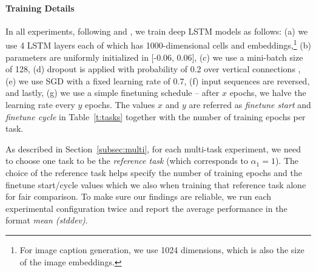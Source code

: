 \paragraph{Training Details}

In all experiments, following \citet{sutskever14} and \citet{luong15}, we train deep LSTM
models as follows: (a) we use 4 LSTM layers each of which has
1000-dimensional cells and embeddings,\footnote{For image caption generation, we use 1024
dimensions, which is also the size of the image embeddings.} (b) parameters are
uniformly initialized in [-0.06, 0.06], (c) we use a mini-batch size of 128, (d)
dropout is applied with probability of 0.2 over vertical connections
\citep{pham2014dropout}, (e) we use SGD with a fixed
learning rate of 0.7, (f) input sequences are reversed, and lastly, (g) we use a simple finetuning schedule -- after $x$
epochs, we halve the learning rate every $y$ epochs. The values $x$ and $y$
are referred as {\it finetune start} and {\it finetune cycle} in
Table~\ref{t:tasks} together with the number of training epochs per task.

As described in Section~\ref{subsec:multi}, for each multi-task
experiment, we need to choose one task to be the {\it reference
task} (which corresponds to $\alpha_1 = 1$). The choice of the
reference task helps specify the number of training epochs and the
finetune start/cycle values which we also when training that reference
task alone for fair comparison. To make sure our findings are
reliable, we run each experimental configuration twice and
report the average performance in the format {\it mean (stddev)}.

